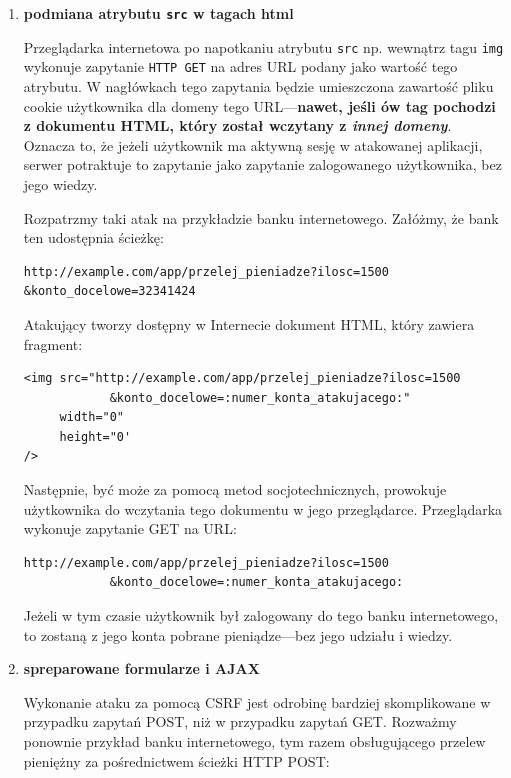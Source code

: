 \documentclass[12pt,polish,a4paper,]{report}
\begin{document}
\begin{enumerate}
\def\labelenumi{\arabic{enumi}.}
\item
  \textbf{podmiana atrybutu \texttt{src} w tagach html}

  Przeglądarka internetowa po napotkaniu atrybutu \texttt{src} np.
  wewnątrz tagu \texttt{img} wykonuje zapytanie \texttt{HTTP\ GET} na
  adres URL podany jako wartość tego atrybutu. W nagłówkach tego
  zapytania będzie umieszczona zawartość pliku cookie użytkownika dla
  domeny tego URL---\textbf{nawet, jeśli ów tag pochodzi z dokumentu
  HTML, który został wczytany z \emph{innej domeny}}. Oznacza to, że
  jeżeli użytkownik ma aktywną sesję w atakowanej aplikacji, serwer
  potraktuje to zapytanie jako zapytanie zalogowanego użytkownika, bez
  jego wiedzy.

  Rozpatrzmy taki atak na przykładzie banku internetowego. Załóżmy, że
  bank ten udostępnia ścieżkę:

\begin{verbatim}
http://example.com/app/przelej_pieniadze?ilosc=1500
&konto_docelowe=32341424
\end{verbatim}

  Atakujący tworzy dostępny w Internecie dokument HTML, który zawiera
  fragment:

\begin{verbatim}
<img src="http://example.com/app/przelej_pieniadze?ilosc=1500
            &konto_docelowe=:numer_konta_atakujacego:"
     width="0"
     height="0'
/>
\end{verbatim}

  Następnie, być może za pomocą metod socjotechnicznych, prowokuje
  użytkownika do wczytania tego dokumentu w jego przeglądarce.
  Przeglądarka wykonuje zapytanie GET na URL:

\begin{verbatim}
http://example.com/app/przelej_pieniadze?ilosc=1500
            &konto_docelowe=:numer_konta_atakujacego:
\end{verbatim}

  Jeżeli w tym czasie użytkownik był zalogowany do tego banku
  internetowego, to zostaną z jego konta pobrane pieniądze---bez jego
  udziału i wiedzy.
\item
  \textbf{spreparowane formularze i AJAX}

  Wykonanie ataku za pomocą CSRF jest odrobinę bardziej skomplikowane w
  przypadku zapytań POST, niż w przypadku zapytań GET. Rozważmy ponownie
  przykład banku internetowego, tym razem obsługującego przelew
  pieniężny za pośrednictwem ścieżki HTTP POST:


\end{enumerate}
\end{document}

